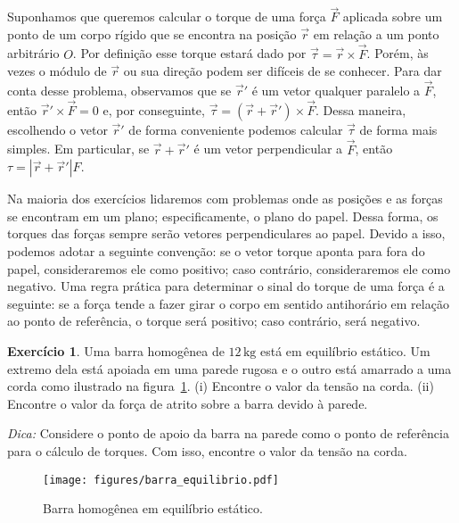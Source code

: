 \documentclass[12pt,a4paper]{article}
\theoremstyle{definition}
\newtheorem{ex}{Exercício}[section]
\begin{document}
Suponhamos que queremos calcular o torque de uma força $\vec F$
aplicada sobre um ponto de um corpo rígido que se encontra na posição
$\vec r$ em relação a um ponto arbitrário $O$. Por definição esse
torque estará dado por $\vec\tau=\vec r\times\vec F$. Porém, às vezes
o módulo de $\vec r$ ou sua direção podem ser difíceis de se
conhecer. Para dar conta desse problema, observamos que se $\vec r'$ é
um vetor qualquer paralelo a $\vec F$, então $\vec r'\times\vec F=0$
e, por conseguinte, $\vec\tau=(\vec r+\vec r')\times \vec F$. Dessa
maneira, escolhendo o vetor $\vec r'$ de forma conveniente podemos
calcular $\vec\tau$ de forma mais simples. Em particular, se
$\vec r+\vec r'$ é um vetor perpendicular a $\vec F$, então
$\tau=|\vec r+\vec r'|F$.

Na maioria dos exercícios lidaremos com problemas onde as posições e
as forças se encontram em um plano; especificamente, o plano do
papel. Dessa forma, os torques das forças sempre serão vetores
perpendiculares ao papel. Devido a isso, podemos adotar a seguinte
convenção: se o vetor torque aponta para fora do papel, consideraremos
ele como positivo; caso contrário, consideraremos ele como
negativo. Uma regra prática para determinar o sinal do torque de uma
força é a seguinte: se a força tende a fazer girar o corpo em sentido
antihorário em relação ao ponto de referência, o torque será positivo;
caso contrário, será negativo.

\begin{ex}
  Uma barra homogênea de $12\,\mathrm{kg}$ está em equilíbrio
  estático. Um extremo dela está apoiada em uma parede rugosa e o
  outro está amarrado a uma corda como ilustrado na
  figura~\ref{fig:barra_equilibrio}. (i) Encontre o valor da tensão na
  corda. (ii) Encontre o valor da força de atrito sobre a barra devido
  à parede.

  \noindent\textit{Dica:} Considere o ponto de apoio da barra na parede como o ponto de referência para o cálculo de torques. Com isso, encontre o valor da tensão na corda.
  \begin{figure}[t]
    \centering
    \texttt{[image: figures/barra\_equilibrio.pdf]}
    \caption{Barra homogênea em equilíbrio estático.}
    \label{fig:barra_equilibrio}
  \end{figure}
\end{ex}
\end{document}
